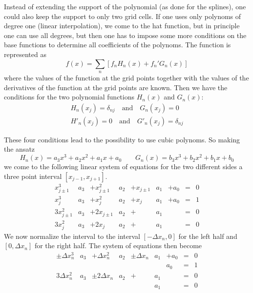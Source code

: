 Instead of extending the support of the polynomial (as done for
the splines), one could also keep the support to only two grid
cells. If one uses only polynoms of degree one (linear interpolation),
we come to the hat function, but in principle one can use all degrees,
but then one has to impose some more conditions on the base functions
to determine all coefficients of the polynoms.
The function is represented as
\begin{displaymath}
  f(x)=\sum_n\left[ f_n H_n(x) + f_n' G_n(x)\right]
\end{displaymath}
where the values of the function at the grid points together with the
values of the derivatives of the function at the grid points are
known. Then we have the conditions for the two polynomial functions
$H_n(x)$ and $G_n(x)$:
\begin{eqnarray*}
  H_n(x_j)=\delta_{nj}\quad\mbox{and}\quad G_n(x_j)=0\\
  H'_n(x_j)=0\quad\mbox{and}\quad G'_n(x_j)=\delta_{nj}
\end{eqnarray*}

These four conditions lead to the possibility to use cubic
polynoms. So making the ansatz
\begin{displaymath}
  H_n(x)=a_3x^3+a_2x^2+a_1x+a_0\qquad G_n(x)=b_3x^3+b_2x^2+b_1x+b_0
\end{displaymath}
we come to the following linear system of equations for the two different
sides a three point interval $[x_{j-1},x_{j+1}]$.
\begin{align*}
  x_{j\pm1}^3 &a_3 &+x_{j\pm1}^2&a_2 &+x_{j\pm1}&a_1&+a_0 &=&0\\
  x_{j}^3   &a_3 &+x_{j}^2&a_2  &+x_{j}&a_1&+a_0 &=&1\\
  3x_{j\pm1}^2&a_3 &+2x_{j\pm1}&a_2&+&a_1 &&=& 0\\
  3x_j^2&a_3    &+2x_j&a_2&+&a_1& &=& 0
\end{align*}
We now normalize the interval to the interval $[-\Delta x_n,0]$ for the left
half and $[0,\Delta x_n]$ for the right half. The system of equations then
become
\begin{align*}
  \pm\Delta x_n^3 &a_3 &+\Delta x_n^2&a_2 &\pm\Delta x_n&a_1&+a_0 &=&0\\
   & &&  &&&a_0 &=&1\\
  3\Delta x_n^2&a_3 &\pm2\Delta x_n&a_2&+&a_1 &&=& 0\\
  &    &&&&a_1& &=& 0
\end{align*}


